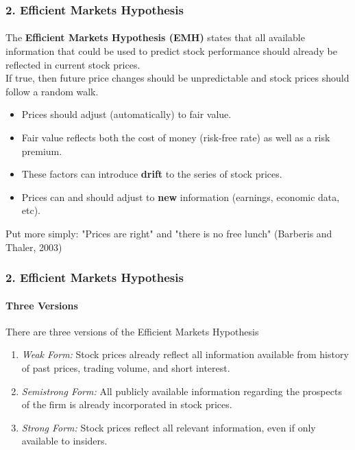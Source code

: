 \documentclass{beamer}
\begin{document}
\begin{frame}[t]
    \frametitle{2. Efficient Markets Hypothesis}
    \framesubtitle{}

    The \textbf{Efficient Markets Hypothesis (EMH)} states that
    all available information that could be used to predict 
    stock performance should already be reflected in current stock prices.\\
    \vspace{1em}   
    If true, then future price changes should be 
    unpredictable and stock prices should follow a random walk.\\
    \vspace{1em}
    \begin{itemize}
        \item Prices should adjust (automatically) to fair value.  
        \item Fair value reflects both the cost of money 
        (risk-free rate) as well as a risk premium.   
        \item These factors can introduce \textbf{drift} 
        to the series of stock prices.
        \item Prices can and should adjust to \textbf{new} information (earnings, 
        economic data, etc).
    \end{itemize}
    Put more simply: "Prices are right" and "there is no free lunch" (Barberis and Thaler, 2003)

\end{frame}

\begin{frame}[t]
    \frametitle{2. Efficient Markets Hypothesis}
    \framesubtitle{Three Versions}

    There are three versions of the Efficient Markets Hypothesis
    \begin{enumerate}
        \item \textit{Weak Form:} Stock prices already reflect all information 
        available from history of past prices, trading volume, and short interest.
        \item \textit{Semistrong Form:} All publicly available information 
        regarding the prospects of the firm is already incorporated in stock prices.
        \item \textit{Strong Form:} Stock prices reflect all relevant information, 
        even if only available to insiders.
    \end{enumerate}

\end{frame}
\end{document}
